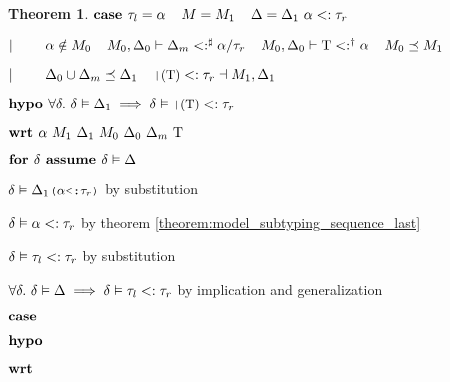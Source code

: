 \documentclass[acmsmall]{acmart}
\theoremstyle{definition}
\newtheorem{theorem}{Theorem}[section]
\begin{document}
\begin{theorem}
    \item \Z $\textbf{case } 
      \tau_l = \alpha
      \hspace{4mm}
      M = M_1
      \hspace{4mm}
      \Delta = \Delta_1\ \alpha <: \tau_r
    $
    \item \Z $|\ \ \ \ \ \ \ 
      \alpha \notin M_0
      \hspace{4mm}
      M_0, \Delta_0 \vdash \Delta_m <:^\sharp \alpha \slash \tau_r
      \hspace{4mm}
      M_0, \Delta_0 \vdash \mathrm{T} <:^\dagger \alpha
      \hspace{4mm}
      M_0 \preceq M_1
    $
    \item \Z $\contin
      \Delta_0 \cup \Delta_m \preceq \Delta_1
      \I
      \J{|$(\Tau)$} <: \tau_r \given M_1, \Delta_1
    $
    \item \Z $\B{hypo } \forall \delta .\ \delta \satisfies \Delta_1 \implies
      \delta \satisfies \J{|$(\Tau)$} <: \tau_r
    $
    \item \Z $\B{wrt } \alpha\ M_1\ \Delta_1\ M_0\ \Delta_0\ \Delta_m\ \Tau$
      \item \Z\Z $\textbf{for } \delta \textbf{ assume } \delta \vDash \Delta$
        \item \Z\Z\Z $\delta \satisfies \Delta_1 \J{($\alpha$<:$\tau_r$)}$ by substitution
        \item \Z\Z\Z $\delta \vDash \alpha <: \tau_r$ by theorem \ref{theorem:model_subtyping_sequence_last} 
        \item \Z\Z\Z $\delta \vDash \tau_l <: \tau_r$ by substitution 
      \item \Z\Z $\forall \delta .\ \delta \vDash \Delta \implies \delta \vDash \tau_l <: \tau_r$ 
      by implication and generalization 
      \item \Z\Z {} 

    \item \Z $\textbf{case } $
    \item \Z $\textbf{hypo } $
    \item \Z $\textbf{wrt } $
      \item \Z\Z {} 


\end{theorem}
\end{document}
